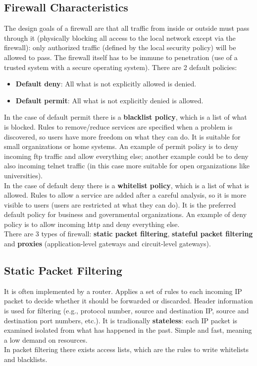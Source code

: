 \documentclass[a4paper, 10pt, titlepage]{article}
\begin{document}
\subsection*{Firewall Characteristics}
The design goals of a firewall are that all traffic from inside or outside must pass through it (physically blocking all access to the local network except via the firewall): only authorized traffic (defined by the local security policy) will be allowed to pass. The firewall itself has to be immune to penetration (use of a trusted system with a secure operating system). There are 2 default policies:
\begin{itemize}
	\item \textbf{Default deny}: All what is not explicitly allowed is denied.
	\item \textbf{Default permit}: All what is not explicitly denied is allowed.
\end{itemize}
In the case of default permit there is a \textbf{blacklist policy}, which is a list of what is blocked. Rules to remove/reduce services are specified when a problem is discovered, so users have more freedom on what they can do. It is suitable for small organizations or home systems. An example of permit policy is to deny incoming ftp traffic and allow everything else; another example could be to deny also incoming telnet traffic (in this case more suitable for open organizations like universities). \medskip\\
In the case of default deny there is a \textbf{whitelist policy}, which is a list of what is allowed. Rules to allow a service are added after a careful analysis, so it is more visible to users (users are restricted at what they can do). It is the preferred default policy for business and governmental organizations. An example of deny policy is to allow incoming http and deny everything else. \medskip\\
There are 3 types of firewall: \textbf{static packet filtering}, \textbf{stateful packet filtering} and \textbf{proxies} (application-level gateways and circuit-level gateways).

\subsection{Static Packet Filtering}
It is often implemented by a router. Applies a set of rules to each incoming IP packet to decide whether it should be forwarded or discarded. Header information is used for filtering (e.g., protocol number, source and destination IP, source and destination port numbers, etc.). It is tradionally \textbf{stateless}: each IP packet is examined isolated from what has happened in the past. Simple and fast, meaning a low demand on resources. \\
In packet filtering there exists access lists, which are the rules to write whitelists and blacklists.
\end{document}
